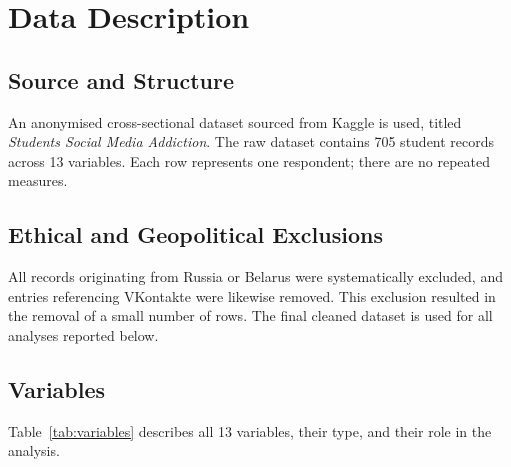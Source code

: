 \documentclass[10pt]{article}
\begin{document}
\section{Data Description}

\subsection{Source and Structure}

An anonymised cross-sectional dataset sourced from Kaggle is used, titled
\textit{Students Social Media Addiction}. The raw dataset contains 705 student
records across 13 variables. Each row represents one respondent; there are no
repeated measures.

\subsection{Ethical and Geopolitical Exclusions}

All records originating from Russia or Belarus were systematically excluded,
and entries referencing VKontakte were likewise removed. This exclusion resulted
in the removal of a small number of rows. The final cleaned dataset is used for
all analyses reported below.

\subsection{Variables}

Table~\ref{tab:variables} describes all 13 variables, their type, and their
role in the analysis.
\end{document}
